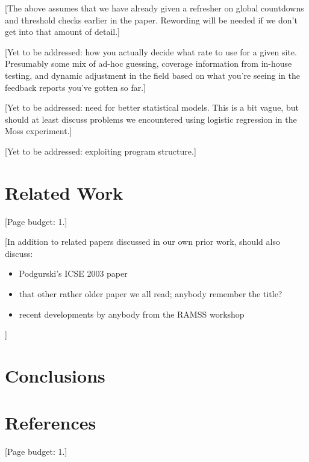 \documentclass{acm_proc_article-sp}
\newcommand{\placeholder}[1]{{\color[cmyk]{0,0.61,0.87,0}[#1]}}
\begin{document}
\placeholder{The above assumes that we have already given a refresher
  on global countdowns and threshold checks earlier in the paper.
  Rewording will be needed if we don't get into that amount of
  detail.}

\placeholder{Yet to be addressed: how you actually decide what rate to
  use for a given site.  Presumably some mix of ad-hoc guessing,
  coverage information from in-house testing, and dynamic adjustment
  in the field based on what you're seeing in the feedback reports
  you've gotten so far.}

\placeholder{Yet to be addressed: need for better statistical models.
  This is a bit vague, but should at least discuss problems we
  encountered using logistic regression in the Moss experiment.}

\placeholder{Yet to be addressed: exploiting program structure.}

\section{Related Work}

\placeholder{Page budget: 1.}

\placeholder{In addition to related papers discussed in our own prior
  work, should also discuss:

  \begin{itemize}
  \item Podgurski's ICSE 2003 paper
  \item that other rather older paper we all read; anybody remember
    the title?
  \item recent developments by anybody from the RAMSS workshop
  \end{itemize}}


\section{Conclusions}


\section{References}

\placeholder{Page budget: 1.}
\end{document}

